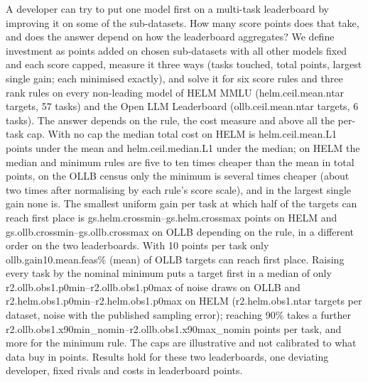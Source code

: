A developer can try to put one model first on a multi-task leaderboard by improving it on some of the sub-datasets. How many score points does that take, and does the answer depend on how the leaderboard aggregates?
We define investment as points added on chosen sub-datasets with all other models fixed and each score capped, measure it three ways (tasks touched, total points, largest single gain; each minimised exactly), and solve it for six score rules and three rank rules on every non-leading model of HELM MMLU (\num{helm.ceil.mean.ntar} targets, 57 tasks) and the Open LLM Leaderboard (\num{ollb.ceil.mean.ntar} targets, 6 tasks).
The answer depends on the rule, the cost measure and above all the per-task cap. With no cap the median total cost on HELM is \num{helm.ceil.mean.L1} points under the mean and \num{helm.ceil.median.L1} under the median; on HELM the median and minimum rules are five to ten times cheaper than the mean in total points, on the OLLB census only the minimum is several times cheaper (about two times after normalising by each rule's score scale), and in the largest single gain none is. The smallest uniform gain per task at which half of the targets can reach first place is \num{gs.helm.crossmin}--\num{gs.helm.crossmax} points on HELM and \num{gs.ollb.crossmin}--\num{gs.ollb.crossmax} on OLLB depending on the rule, in a different order on the two leaderboards. With 10 points per task only \num{ollb.gain10.mean.feas}\% (mean) of OLLB targets can reach first place. Raising every task by the nominal minimum puts a target first in a median of only \num{r2.ollb.obs1.p0min}--\num{r2.ollb.obs1.p0max} of noise draws on OLLB and \num{r2.helm.obs1.p0min}--\num{r2.helm.obs1.p0max} on HELM (\num{r2.helm.obs1.ntar} targets per dataset, noise with the published sampling error); reaching 90\% takes a further \num{r2.ollb.obs1.x90min_nomin}--\num{r2.ollb.obs1.x90max_nomin} points per task, and more for the minimum rule.
The caps are illustrative and not calibrated to what data buy in points. Results hold for these two leaderboards, one deviating developer, fixed rivals and costs in leaderboard points.
